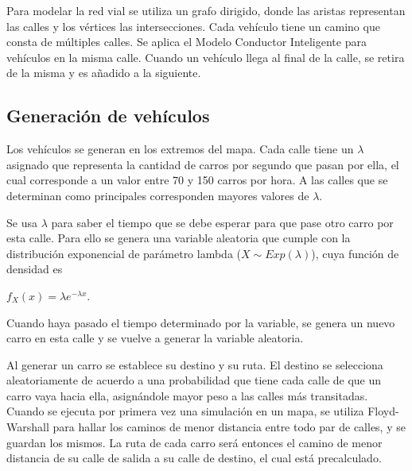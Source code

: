 \documentclass[colorinlistoftodos,twoside,twocolumn]{article} %
\begin{document}
	Para modelar la red vial se utiliza un grafo dirigido, donde las aristas representan las calles y los vértices las intersecciones. Cada vehículo tiene un camino que consta de múltiples calles. Se aplica el Modelo Conductor Inteligente para vehículos en la misma calle. Cuando un vehículo llega al final de la calle, se retira de la misma y es añadido a la siguiente.
	
	\subsection{Generación de vehículos}
	
	Los veh\'iculos se generan en los extremos del mapa. Cada calle tiene un $\lambda$ asignado que representa la cantidad de carros por segundo que pasan por ella, el cual corresponde a un valor entre 70 y 150 carros por hora. A las calles que se determinan como principales corresponden mayores valores de $\lambda$.
	
	Se usa $\lambda$ para saber el tiempo que se debe esperar para que pase otro carro por esta calle. Para ello se genera una variable aleatoria que cumple con la distribuci\'on  exponencial de par\'ametro lambda ($X \sim Exp(\lambda)$), cuya funci\'on de densidad es
	\begin{center}
		$f_X(x) = \lambda e^{-\lambda x}.$
	\end{center}

	Cuando haya pasado el tiempo determinado por la variable, se genera un nuevo carro en esta calle y se vuelve a generar la variable aleatoria.
	
	Al generar un carro se establece su destino y su ruta. El destino se selecciona aleatoriamente de acuerdo a una probabilidad que tiene cada calle de que un carro vaya hacia ella, asign\'andole mayor peso a las calles m\'as transitadas. Cuando se ejecuta por primera vez una simulaci\'on en un mapa, se utiliza Floyd-Warshall para hallar los caminos de menor distancia entre todo par de calles, y se guardan los mismos. La ruta de cada carro ser\'a entonces el camino de menor distancia de su calle de salida a su calle de destino, el cual est\'a precalculado.
	
	
 
\end{document}
